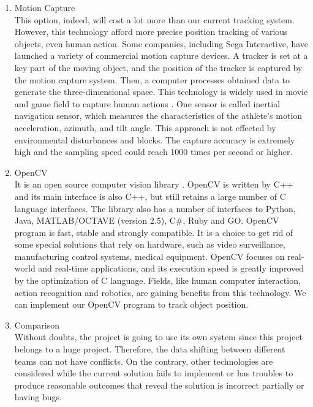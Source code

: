 \documentclass[10pt,journal,compsoc, draftclsnofoot,onecolumn]{IEEEtran}
\begin{document}
\begin{enumerate}
\begin{enumerate}
    \item Motion Capture \\
    This option, indeed, will cost a lot more than our current tracking system. However, this technology afford more precise position tracking of various objects, even human action. Some companies, including Sega Interactive, have launched a variety of commercial motion capture devices. A tracker is set at a key part of the moving object, and the position of the tracker is captured by the motion capture system. Then, a computer processes obtained data to generate the three-dimensional space. This technology is widely used in movie and game field to capture human actions \cite{106:online}. One sensor is called inertial navigation sensor, which measures the characteristics of the athlete's motion acceleration, azimuth, and tilt angle. This approach is not effected by environmental disturbances and blocks. The capture accuracy is extremely high and the sampling speed could reach 1000 times per second or higher. 
    \item OpenCV \\
    It is an open source computer vision library \cite{107:online}. OpenCV is written by C++ and its main interface is also C++, but still retains a large number of C language interfaces. The library also has a number of interfaces to Python, Java, MATLAB/OCTAVE (version 2.5), C\#, Ruby and GO. OpenCV program is fast, stable and strongly compatible. It is a choice to get rid of some special solutions that rely on hardware, such as video surveillance, manufacturing control systems, medical equipment. OpenCV focuses on real-world and real-time applications, and its execution speed is greatly improved by the optimization of C language. Fields, like human computer interaction, action recognition and robotics, are gaining benefits from this technology. We can implement our OpenCV program to track object position. 
    \item Comparison \\
    Without doubts, the project is going to use its own system since this project belongs to a huge project. Therefore, the data shifting between different teams can not have conflicts. On the contrary, other technologies are considered while the current solution fails to implement or has troubles to produce reasonable outcomes that reveal the solution is incorrect partially or having bugs. 
    \end{enumerate}
\end{enumerate}
\end{document}
